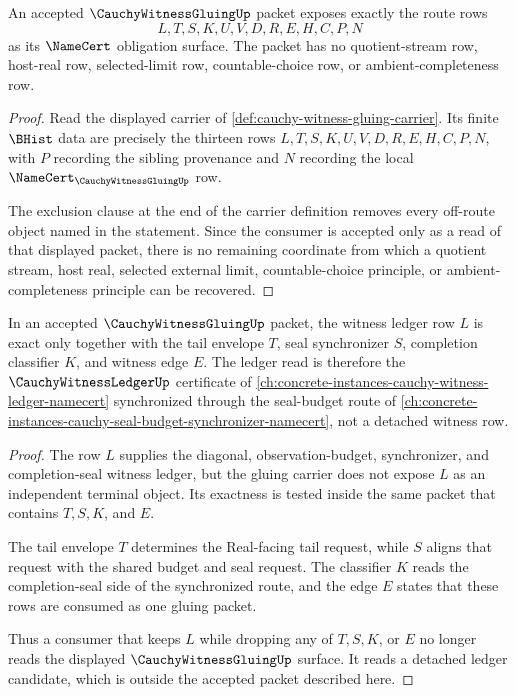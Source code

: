 \begin{theorem}
\label{thm:cauchy-witness-gluing-route-obligation-surface}
An accepted $\CauchyWitnessGluingUp$ packet exposes exactly the route rows
$$
L,T,S,K,U,V,D,R,E,H,C,P,N
$$
as its $\NameCert$ obligation surface. The packet has no quotient-stream row, host-real row, selected-limit row, countable-choice row, or ambient-completeness row.
\end{theorem}
\begin{proof}
Read the displayed carrier of \autoref{def:cauchy-witness-gluing-carrier}. Its finite $\BHist$ data are precisely the thirteen rows $L,T,S,K,U,V,D,R,E,H,C,P,N$, with $P$ recording the sibling provenance and $N$ recording the local $\NameCert_{\CauchyWitnessGluingUp}$ row.

The exclusion clause at the end of the carrier definition removes every off-route object named in the statement. Since the consumer is accepted only as a read of that displayed packet, there is no remaining coordinate from which a quotient stream, host real, selected external limit, countable-choice principle, or ambient-completeness principle can be recovered.
\end{proof}

\begin{theorem}
\label{thm:cauchy-witness-gluing-witness-ledger-exactness}
In an accepted $\CauchyWitnessGluingUp$ packet, the witness ledger row $L$ is exact only together with the tail envelope $T$, seal synchronizer $S$, completion classifier $K$, and witness edge $E$. The ledger read is therefore the $\CauchyWitnessLedgerUp$ certificate of \autoref{ch:concrete-instances-cauchy-witness-ledger-namecert} synchronized through the seal-budget route of \autoref{ch:concrete-instances-cauchy-seal-budget-synchronizer-namecert}, not a detached witness row.
\end{theorem}
\begin{proof}
The row $L$ supplies the diagonal, observation-budget, synchronizer, and completion-seal witness ledger, but the gluing carrier does not expose $L$ as an independent terminal object. Its exactness is tested inside the same packet that contains $T,S,K$, and $E$.

The tail envelope $T$ determines the Real-facing tail request, while $S$ aligns that request with the shared budget and seal request. The classifier $K$ reads the completion-seal side of the synchronized route, and the edge $E$ states that these rows are consumed as one gluing packet.

Thus a consumer that keeps $L$ while dropping any of $T,S,K$, or $E$ no longer reads the displayed $\CauchyWitnessGluingUp$ surface. It reads a detached ledger candidate, which is outside the accepted packet described here.
\end{proof}

